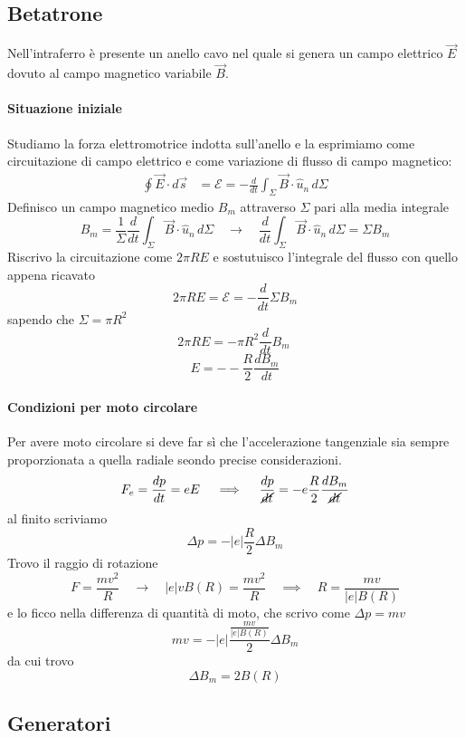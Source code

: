\documentclass[x11names]{report}
\begin{document}
\subsection{Betatrone}
Nell'intraferro è presente un anello cavo nel quale si genera un campo elettrico \(\vec{E}\) dovuto al campo magnetico variabile \(\vec{B}\). 

\paragraph{Situazione iniziale}
Studiamo la forza elettromotrice indotta sull'anello e la esprimiamo come circuitazione di campo elettrico e come variazione di flusso di campo magnetico:
\begin{align*}
	\oint \vec{E}\cdot d\vec{s} &= \mathcal{E} = -\frac{d}{dt}\int_\Sigma \vec{B}\cdot \hat{u}_n \, d\Sigma 
\end{align*}
Definisco un campo magnetico medio \(B_m\) attraverso \(\Sigma\) pari alla media integrale
\[
B_m = \frac{1}{\Sigma}\frac{d}{dt}\int_\Sigma \vec{B}\cdot \hat{u}_n \, d\Sigma \quad \to \quad \frac{d}{dt}\int_\Sigma \vec{B}\cdot \hat{u}_n \, d\Sigma = \Sigma B_m
\]
Riscrivo la circuitazione come \(2\pi R E\) e sostutuisco l'integrale del flusso con quello appena ricavato
\[
2\pi R E = \mathcal{E} = -\frac{d}{dt}\Sigma B_m
\]
sapendo che \(\Sigma = \pi R^2\)
\[
2\pi R E = -\pi R^2\frac{d}{dt}B_m\ 
\]
\begin{equation}
	E = --\frac{R}{2}\frac{dB_m}{dt}
\end{equation}

\paragraph{Condizioni per moto circolare}
Per avere moto circolare si deve far sì che l'accelerazione tangenziale sia sempre proporzionata a quella radiale seondo precise considerazioni.
\[
F_e = \frac{dp}{dt} = eE \quad \implies \quad \frac{dp}{\cancel{dt}} = -e\frac{R}{2}\frac{dB_m}{\cancel{dt}}
\]
al finito scriviamo
\[
\Delta p = -|e|\frac{R}{2}\Delta B_m
\]
Trovo il raggio di rotazione
\[
F = \frac{mv^2}{R} \quad \to \quad |e| v B(R) = \frac{mv^2}{R} \quad \implies \quad R = \frac{mv}{|e|B(R)}
\]
e lo ficco nella differenza di quantità di moto, che scrivo come \(\Delta p = mv\)
\[
mv = -|e|\frac{\frac{mv}{|e|B(R)}}{2}\Delta B_m
\]
da cui trovo
\begin{equation}
	\Delta B_m = 2B(R)
\end{equation}
\subsection{Generatori}
\end{document}

